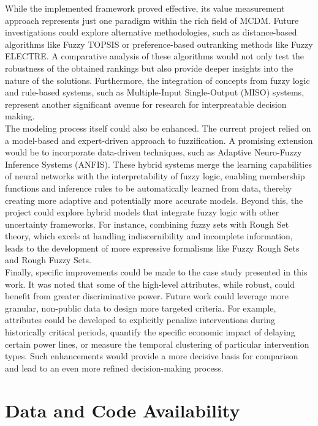 While the implemented framework proved effective, its value measurement approach represents just one paradigm within the rich field of MCDM. Future investigations could explore alternative methodologies, such as distance-based algorithms like Fuzzy TOPSIS or preference-based outranking methods like Fuzzy ELECTRE. A comparative analysis of these algorithms would not only test the robustness of the obtained rankings but also provide deeper insights into the nature of the solutions. Furthermore, the integration of concepts from fuzzy logic and rule-based systems, such as Multiple-Input Single-Output (MISO) systems, represent another significant avenue for research for interpreatable decision making. \\

The modeling process itself could also be enhanced. The current project relied on a model-based and expert-driven approach to fuzzification. A promising extension would be to incorporate data-driven techniques, such as Adaptive Neuro-Fuzzy Inference Systems (ANFIS). These hybrid systems merge the learning capabilities of neural networks with the interpretability of fuzzy logic, enabling membership functions and inference rules to be automatically learned from data, thereby creating more adaptive and potentially more accurate models. Beyond this, the project could explore hybrid models that integrate fuzzy logic with other uncertainty frameworks. For instance, combining fuzzy sets with Rough Set theory, which excels at handling indiscernibility and incomplete information, leads to the development of more expressive formalisms like Fuzzy Rough Sets and Rough Fuzzy Sets.\\

Finally, specific improvements could be made to the case study presented in this work. It was noted that some of the high-level attributes, while robust, could benefit from greater discriminative power. Future work could leverage more granular, non-public data to design more targeted criteria. For example, attributes could be developed to explicitly penalize interventions during historically critical periods, quantify the specific economic impact of delaying certain power lines, or measure the temporal clustering of particular intervention types. Such enhancements would provide a more decisive basis for comparison and lead to an even more refined decision-making process.

\newpage
\section*{Data and Code Availability}


